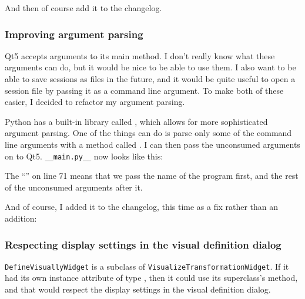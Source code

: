\documentclass[../development.tex]{subfiles}
\begin{document}


And then of course add it to the changelog.


\subsubsection{Improving argument parsing\label{development:making-v0.2.2:improving-argument-parsing}}

Qt5 accepts arguments to its main method. I don't really know what these arguments can do, but it would be nice to be able to use them. I also want to be able to save sessions as files in the future, and it would be quite useful to open a session file by passing it as a command line argument. To make both of these easier, I decided to refactor my argument parsing.

Python has a built-in library called , which allows for more sophisticated argument parsing. One of the things  can do is parse only some of the command line arguments with a method called \cite{argparse-parse-known-args}. I can then pass the unconsumed arguments on to Qt5. \texttt{\_\_main.py\_\_} now looks like this:


The \enquote{} on line 71 means that we pass the name of the program first, and the rest of the unconsumed arguments after it.

And of course, I added it to the changelog, this time as a fix rather than an addition:


\subsubsection{Respecting display settings in the visual definition dialog\label{development:making-v0.2.2:respecting-display-settings-in-the-visual-definition-dialog}}

\texttt{DefineVisuallyWidget} is a subclass of \texttt{VisualizeTransformationWidget}. If it had its own instance attribute of type , then it could use its superclass's  method, and that would respect the display settings in the visual definition dialog.
\end{document}

